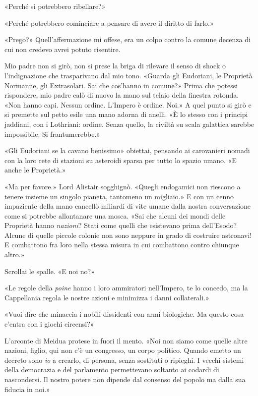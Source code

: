 «Perché si potrebbero ribellare?»

«Perché potrebbero cominciare a pensare di avere il diritto di farlo.»

«Prego?» Quell'affermazione mi offese, era un colpo contro la comune
decenza di cui non credevo avrei potuto risentire.

Mio padre non si girò, non si prese la briga di rilevare il senso di
shock o l'indignazione che trasparivano dal mio tono. «Guarda gli
Eudoriani, le Proprietà Normanne, gli Extrasolari. Sai che cos'hanno in
comune?» Prima che potessi rispondere, mio padre calò di nuovo la mano
sul telaio della finestra rotonda. «Non hanno capi. Nessun ordine.
L'Impero è ordine. Noi.» A quel punto si girò e si premette sul petto
esile una mano adorna di anelli. «È lo stesso con i principi jaddiani,
con i Lothriani: ordine. Senza quello, la civiltà su scala galattica
sarebbe impossibile. Si frantumerebbe.»

«Gli Eudoriani se la cavano benissimo» obiettai, pensando ai carovanieri
nomadi con la loro rete di stazioni su asteroidi sparsa per tutto lo
spazio umano. «E anche le Proprietà.»

«Ma per favore.» Lord Alistair sogghignò. «Quegli endogamici non
riescono a tenere insieme un singolo pianeta, tantomeno un migliaio.» E
con un cenno impaziente della mano cancellò miliardi di vite umane dalla
nostra conversazione come si potrebbe allontanare una mosca. «Sai che
alcuni dei mondi delle Proprietà hanno \emph{nazioni}? Stati come quelli
che esistevano prima dell'Esodo? Alcune di quelle piccole colonie non
sono neppure in grado di costruire astronavi! E combattono fra loro
nella stessa misura in cui combattono contro chiunque altro.»

Scrollai le spalle. «E noi no?»

«Le regole della \emph{poine} hanno i loro ammiratori nell'Impero, te lo
concedo, ma la Cappellania regola le nostre azioni e minimizza i danni
collaterali.»

«Vuoi dire che minaccia i nobili dissidenti con armi biologiche. Ma
questo cosa c'entra con i giochi circensi?»

L'arconte di Meidua protese in fuori il mento. «Noi non siamo come
quelle altre nazioni, figlio, qui non c'è un congresso, un corpo
politico. Quando emetto un decreto sono \emph{io} a crearlo, di persona,
senza sostituti o ripieghi. I vecchi sistemi della democrazia e del
parlamento permettevano soltanto ai codardi di nascondersi. Il nostro
potere non dipende dal consenso del popolo ma dalla sua fiducia in noi.»

